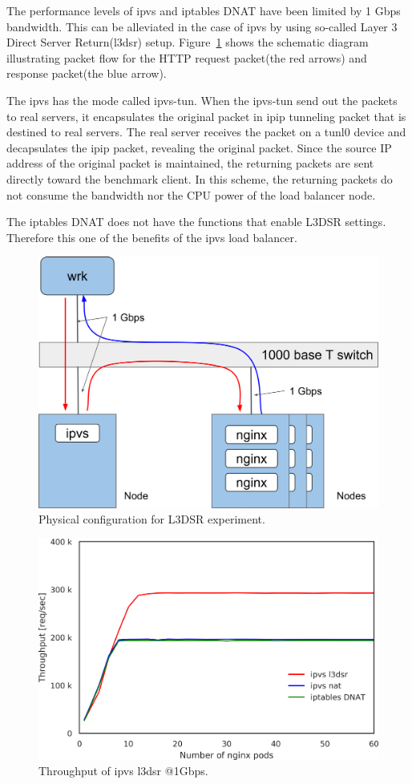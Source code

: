The performance levels of ipvs and iptables DNAT have been limited by 1 Gbps bandwidth.
This can be alleviated in the case of ipvs by using so-called Layer 3 Direct Server Return(l3dsr) setup.
Figure~\ref{fig:bench_1g_l3dsr} shows the schematic diagram illustrating packet flow for the HTTP request packet(the red arrows) and response packet(the blue arrow).

The ipvs has the mode called ipvs-tun.
When the ipvs-tun send out the packets to real servers, it encapsulates the original packet in ipip tunneling packet that is destined to real servers.
The real server receives the packet on a tunl0 device and decapsulates the ipip packet, revealing the original packet.
Since the source IP address of the original packet is maintained, the returning packets are sent directly toward the benchmark client.
In this scheme, the returning packets do not consume the bandwidth nor the CPU power of the load balancer node.

The iptables DNAT does not have the functions that enable L3DSR settings.
Therefore this one of the benefits of the ipvs load balancer.

\begin{figure}[h]
  \centering
  \includegraphics[width=0.8\columnwidth]{Figs/bench_1g_l3dsr}
  \caption{Physical configuration for L3DSR experiment.}
  \label{fig:bench_1g_l3dsr}
\end{figure}

\begin{figure}[h]
  \centering
  \includegraphics[width=0.8\columnwidth]{Figs/ipvs_l3dsr_1g.png}
  \caption{Throughput of ipvs l3dsr @1Gbps.}
  \label{fig:ipvs_l3dsr_1g.png}
\end{figure}

